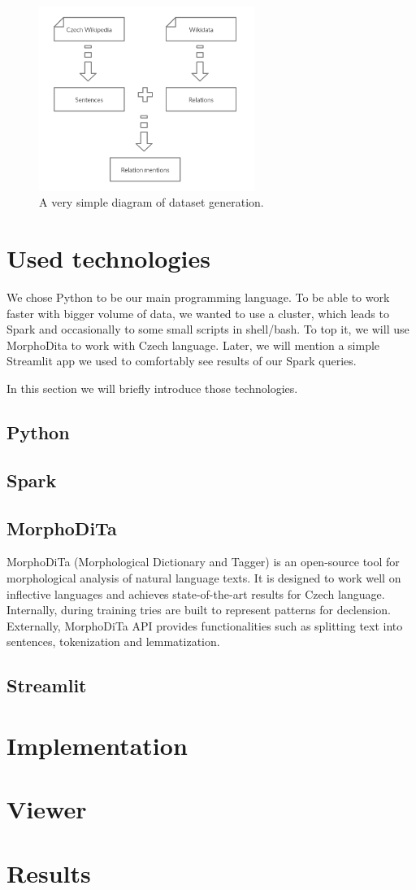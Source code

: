 \begin{figure}[h]
\begin{center}
\includegraphics[width=70mm, height=60mm]{./img/a_very_simple_diagram}
\caption{A very simple diagram of dataset generation.}
\label{obr02:AVerySimple}
\end{center}
\end{figure}

\section{Used technologies}
We chose Python to be our main programming language. To be able to work faster with bigger volume of data, we wanted to use a cluster, which leads to Spark and occasionally to some small scripts in shell/bash. To top it, we will use MorphoDita to work with Czech language. Later, we will mention a simple Streamlit app we used to comfortably see results of our Spark queries.

In this section we will briefly introduce those technologies.
\subsection{Python}
\subsection{Spark}

\subsection{MorphoDiTa}
MorphoDiTa \cite{Morphodita} (Morphological Dictionary and Tagger) is an open-source tool for morphological analysis of natural language texts. It is designed to work well on inflective languages and achieves state-of-the-art results for Czech language. Internally, during training tries are built to represent patterns for declension. Externally, MorphoDiTa API provides functionalities such as splitting text into sentences, tokenization and lemmatization. 

\subsection{Streamlit}


\section{Implementation}
\section{Viewer}
\section{Results}
